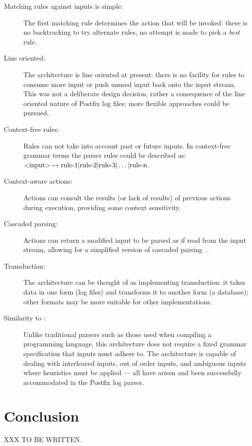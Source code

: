 \label{Architecture characteristics}

\begin{description}

    \item [Matching rules against inputs is simple:]  The first matching
        rule determines the action that will be invoked: there is no
        backtracking to try alternate rules, no attempt is made to pick a
        \textit{best\/} rule.

    \item [Line oriented:]  The architecture is line oriented at present:
        there is no facility for rules to consume more input or push unused
        input back onto the input stream.  This was not a deliberate design
        decision, rather a consequence of the line oriented nature of
        Postfix log files; more flexible approaches could be pursued.

    \item [Context-free rules:]  Rules can not take into account past or
        future inputs.  In context-free grammar terms the parser rules
        could be described as:
        \newline{}$\text{\textless{}input\textgreater{}} \mapsto
        \text{rule-1} | \text{rule-2} | \text{rule-3} | \dots |
        \text{rule-n}$.

    \item [Context-aware actions:] Actions can consult the results (or lack
        of results) of previous actions during execution, providing some
        context sensitivity.  
        
    \item [Cascaded parsing:] Actions can return a modified input to be
        parsed as if read from the input stream, allowing for a simplified
        version of cascaded parsing~\cite{cascaded-parsing}.

    \item [Transduction:]  The architecture can be thought of as
        implementing transduction: it takes data in one form (log files)
        and transforms it to another form (a database); other formats may
        be more suitable for other implementations.

    \item [Similarity to :] \hfill{} \newline{}
        Unlike traditional parsers such as those used when compiling a
        programming language, this architecture does not require a fixed
        grammar specification that inputs must adhere to.  The architecture
        is capable of dealing with interleaved inputs, out of order inputs,
        and ambiguous inputs where heuristics must be applied --- all have
        arisen and been successfully accommodated in the Postfix log
        parser.

\end{description}


\section{Conclusion}

XXX TO BE WRITTEN\@.

